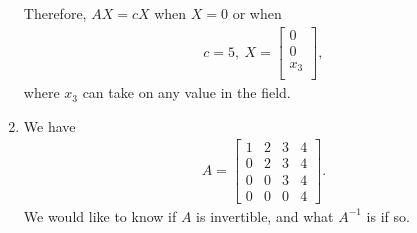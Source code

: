 \documentclass[12pt]{article}
\begin{document}
\begin{enumerate}
    Therefore, $AX = cX$ when $X = 0$ or when
    \begin{align*}
      c = 5,\ X =
      \begin{bmatrix}
        0\\
        0\\
        x_3\\
      \end{bmatrix},
    \end{align*}
    where $x_3$ can take on any value in the field.

  \item
    We have
    \begin{align*}
      A =
      \begin{bmatrix}
        1 & 2 & 3 & 4\\
        0 & 2 & 3 & 4\\
        0 & 0 & 3 & 4\\
        0 & 0 & 0 & 4
      \end{bmatrix}.
    \end{align*}
    We would like to know if $A$ is invertible, and what $A^{-1}$
    is if so.


\end{enumerate}
\end{document}
